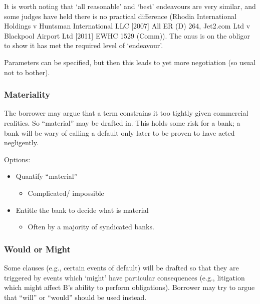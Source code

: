 \documentclass[
]{article}
\providecommand{\tightlist}{%
  \setlength{\itemsep}{0pt}\setlength{\parskip}{0pt}}
\begin{document}
It is worth noting that `all reasonable' and `best' endeavours are very
similar, and some judges have held there is no practical difference
(Rhodia International Holdings v Huntsman International LLC {[}2007{]}
All ER (D) 264, Jet2.com Ltd v Blackpool Airport Ltd {[}2011{]} EWHC
1529 (Comm)). The onus is on the obligor to show it has met the required
level of `endeavour'.

Parameters can be specified, but then this leads to yet more negotiation
(so usual not to bother).

\hypertarget{materiality}{%
\subsubsection{Materiality}\label{materiality}}

The borrower may argue that a term constrains it too tightly given
commercial realities. So ``material'' may be drafted in. This holds some
risk for a bank; a bank will be wary of calling a default only later to
be proven to have acted negligently.

Options:

\begin{itemize}
\tightlist
\item
  Quantify ``material''

  \begin{itemize}
  \tightlist
  \item
    Complicated/ impossible
  \end{itemize}
\item
  Entitle the bank to decide what is material

  \begin{itemize}
  \tightlist
  \item
    Often by a majority of syndicated banks.
  \end{itemize}
\end{itemize}

\hypertarget{would-or-might}{%
\subsubsection{Would or Might}\label{would-or-might}}

Some clauses (e.g., certain events of default) will be drafted so that
they are triggered by events which `might' have particular consequences
(e.g., litigation which might affect B's ability to perform
obligations). Borrower may try to argue that ``will'' or ``would''
should be used instead.
\end{document}
